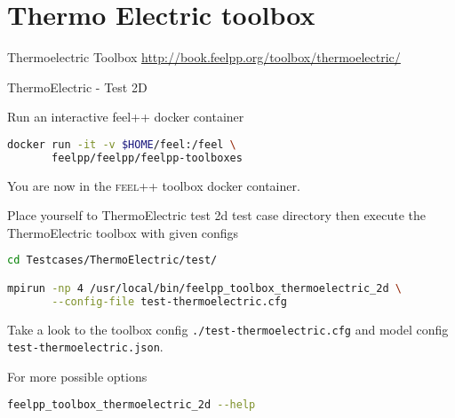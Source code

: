 \section[ThermoElectric]{Thermo Electric toolbox}

\begin{frame}[standout]{Thermoelectric Toolbox}
  \url{http://book.feelpp.org/toolbox/thermoelectric/}

\end{frame}


\begin{frame}{ThermoElectric - Test 2D}

Run an interactive feel++ docker container

\begin{lstlisting}[language=Bash,mathescape=false,emph={docker}]
docker run -it -v $HOME/feel:/feel \
       feelpp/feelpp/feelpp-toolboxes
\end{lstlisting}

You are now in the \textsc{feel++} toolbox docker container.

Place yourself to ThermoElectric test 2d test case directory then execute the
ThermoElectric toolbox with given configs

\begin{lstlisting}[language=Bash,mathescape=false, emph={feelpp_toolbox_thermoelectric_2d}]
cd Testcases/ThermoElectric/test/

mpirun -np 4 /usr/local/bin/feelpp_toolbox_thermoelectric_2d \
       --config-file test-thermoelectric.cfg
\end{lstlisting}

Take a look to the toolbox config \lstinline{./test-thermoelectric.cfg} and model config
\lstinline{test-thermoelectric.json}.

For more possible options
\begin{lstlisting}[language=Bash,mathescape=false, emph={feelpp_toolbox_thermoelectric_2d}]
feelpp_toolbox_thermoelectric_2d --help
\end{lstlisting}

\end{frame}


